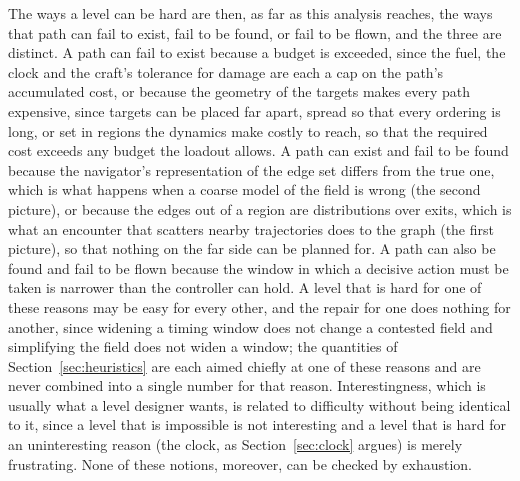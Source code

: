 \documentclass[11pt]{article}
\begin{document}
The ways a level can be hard are then, as far as this analysis reaches, the
ways that path can fail to exist, fail to be found, or fail to be flown, and
the three are distinct. A path can
fail to exist because a budget is exceeded, since the fuel, the clock and
the craft's tolerance for damage are each a cap on the path's accumulated
cost, or because the geometry of the targets makes every path expensive,
since targets can be placed far apart, spread so that every ordering is
long, or set in regions the dynamics make costly to reach, so that the
required cost exceeds any budget the loadout allows. A path can exist and
fail to be found because the navigator's representation of the edge set
differs from the true one, which is what happens when a coarse model of the
field is wrong (the second picture), or because the edges out of a region
are distributions over exits, which is what an
encounter that scatters nearby trajectories does to the graph (the first
picture), so that nothing on the far side can be planned for. A path can
also be found and fail to be flown because the window in which a decisive action
must be taken is narrower than the controller can hold. A level that is hard
for one of these reasons may be easy for every other, and the repair for one
does nothing for another, since widening a timing window does not change a
contested field and simplifying the field does not widen a window; the
quantities of Section~\ref{sec:heuristics} are each aimed chiefly at one of
these reasons and are never combined into a single number for that reason.
Interestingness, which is usually what a level designer wants, is related
to difficulty without being identical to it, since a level that is
impossible is not interesting and a level that is hard for an uninteresting
reason (the clock, as Section~\ref{sec:clock} argues) is merely frustrating.
None of these notions, moreover, can be checked by exhaustion.
\end{document}
